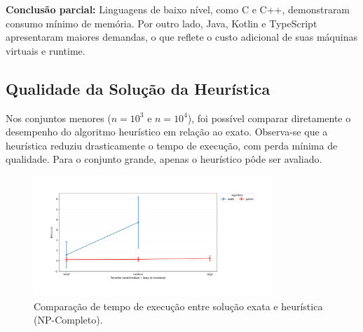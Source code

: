 \documentclass[12pt, a4paper]{article}
\begin{document}
\textbf{Conclusão parcial:} Linguagens de baixo nível, como C e C++, demonstraram consumo mínimo de memória. Por outro lado, Java, Kotlin e TypeScript apresentaram maiores demandas, o que reflete o custo adicional de suas máquinas virtuais e runtime.

\subsection{Qualidade da Solução da Heurística}

Nos conjuntos menores (\(n = 10^3\) e \(n = 10^4\)), foi possível comparar diretamente o desempenho do algoritmo heurístico em relação ao exato. Observa-se que a heurística reduziu drasticamente o tempo de execução, com perda mínima de qualidade. Para o conjunto grande, apenas o heurístico pôde ser avaliado.

\begin{figure}[H]
    \centering
    \includegraphics[width=0.8\textwidth]{img/qualidade_heuristica.png}
    \caption{Comparação de tempo de execução entre solução exata e heurística (NP-Completo).}
    \label{fig:qualidade}
\end{figure}

\begin{table}[H]
    \centering
    \caption{Comparação de tempo de execução entre solução exata e heurística (NP-Completo).}
    \label{tab:qualidade_np}
\end{table}
\end{document}
